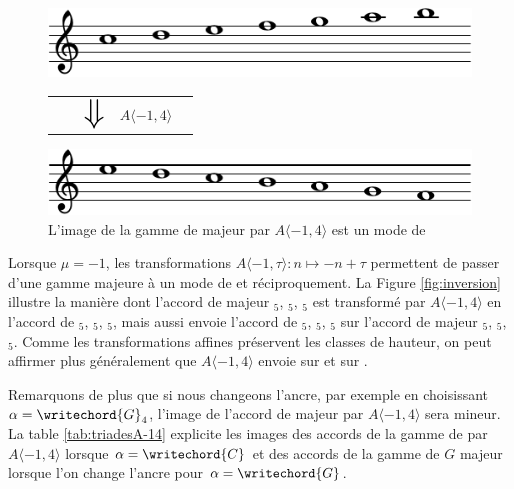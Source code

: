 \begin{figure}
  \includegraphics[width=\columnwidth]{c-maj-crop.pdf}
  \begin{tabularx}{\columnwidth}{ YYYYZ }
    &&$ \mathlarger{\mathlarger{\mathlarger{\mathlarger{\mathlarger{\mathlarger\Downarrow}}}}} $ & $A\langle -1,4 \rangle$&
    \end{tabularx}
  \includegraphics[width=\columnwidth]{e-mod-crop.pdf}
  \caption{L'image de la gamme de  majeur par $A\langle -1,4 \rangle$ est un mode de  }
\end{figure}

Lorsque $\mu = -1$, les transformations $A \langle -1,\tau\rangle : n\mapsto -n + \tau$ permettent de passer d'une gamme majeure à un mode de  et réciproquement. La Figure \ref{fig:inversion} illustre la manière dont l'accord de  majeur $_5$, $_5$, $_5$ est transformé par $A\langle -1,4 \rangle$ en l'accord de   $_5$, $_5$, $_5$, mais aussi envoie l'accord de  $_5$, $_5$, $_5$ sur l'accord de  majeur  $_5$, $_5$, $_5$. Comme les transformations affines préservent les classes de hauteur, on peut affirmer plus généralement que $A \langle -1,4\rangle$ envoie   sur    et  sur . 

Remarquons de plus que si nous changeons l'ancre, par exemple en choisissant $\alpha = \writechord{G}_4$, l'image de l'accord de  majeur par $A\langle-1,4 \rangle$ sera  mineur. La table \ref{tab:triadesA-14} explicite les images des accords de la gamme de  par $A\langle -1,4 \rangle$ lorsque $\alpha = \writechord{C}$ et des accords de la gamme de $G$ majeur lorsque l'on change l'ancre pour $\alpha = \writechord{G}$.


